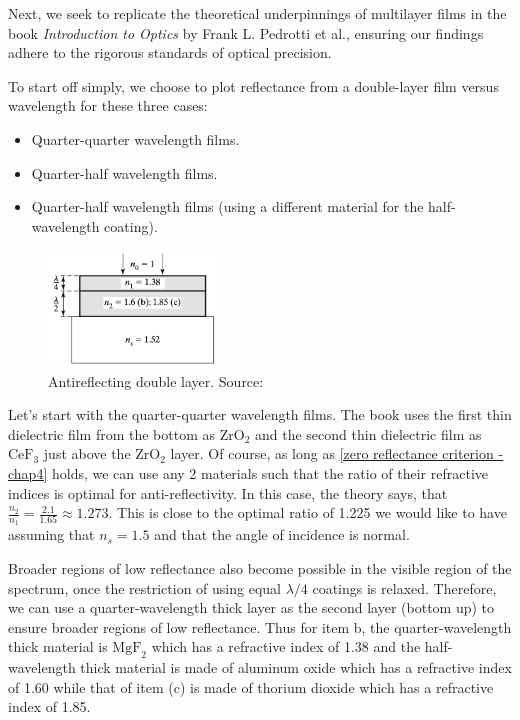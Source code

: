 Next, we seek to replicate the theoretical underpinnings of multilayer films in the book \emph{Introduction to Optics} by Frank L. Pedrotti et al., ensuring our findings adhere to the rigorous standards of optical precision.

To start off simply, we choose to plot reflectance from a double-layer film versus wavelength for these three cases:
\begin{itemize}
    \item Quarter-quarter wavelength films.
    \item Quarter-half wavelength films.
    \item Quarter-half wavelength films (using a different material for the half-wavelength coating).
\end{itemize}

\begin{figure}[ht!]
  \centering
  \includegraphics[width=0.4\textwidth]{Chapters/Figures/Chapter 4 Figures/Antireflecting Double Layer using Quarter and Half-Wavelength Thickness Films Layout.png}
  \caption{Antireflecting double layer. Source: \cite{pedrotti_introduction_2007}}
  \label{fig:Antireflecting double layer}
\end{figure}

Let's start with the quarter-quarter wavelength films. The book uses the first thin dielectric film from the bottom as $\text{ZrO}_2$ and the second thin dielectric film as $\text{CeF}_3$ just above the $\text{ZrO}_2$ layer. Of course, as long as \ref{zero reflectance criterion - chap4} holds, we can use any 2 materials such that the ratio of their refractive indices is optimal for anti-reflectivity. In this case, the theory says, that $\frac{n_2}{n_1} = \frac{2.1}{1.65} \approx 1.273$. This is close to the optimal ratio of 1.225 we would like to have assuming that $n_s = 1.5$ and that the angle of incidence is normal.

Broader regions of low reflectance also become possible in the visible region of the spectrum, once the restriction of using equal $\lambda/4$ coatings is relaxed. Therefore, we can use a quarter-wavelength thick layer as the second layer (bottom up) to ensure broader regions of low reflectance. Thus for item b, the quarter-wavelength thick material is $\text{MgF}_2$ which has a refractive index of 1.38 and the half-wavelength thick material is made of aluminum oxide which has a refractive index of 1.60 while that of item (c) is made of thorium dioxide which has a refractive index of 1.85. %

